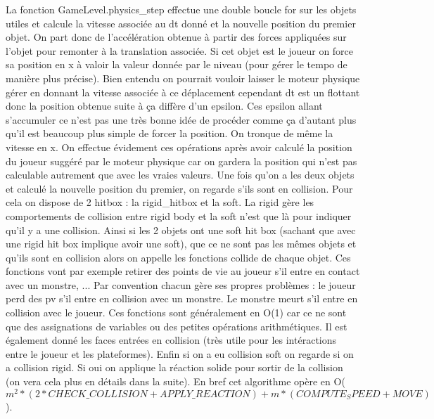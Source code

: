 \documentclass[11pt]{article}
\begin{document}
\indent La fonction GameLevel.physics\_step effectue une double boucle for sur les objets utiles et calcule la vitesse associée au dt donné et la nouvelle position du premier objet. On part donc de l'accélération obtenue à partir des forces appliquées sur l'objet pour remonter à la translation associée. Si cet objet est le joueur on force sa position en x à valoir la valeur donnée par le niveau (pour gérer le tempo de manière plus précise). Bien entendu on pourrait vouloir laisser le moteur physique gérer en donnant la vitesse associée à ce déplacement cependant dt est un flottant donc la position obtenue suite à ça diffère d'un epsilon. Ces epsilon allant s'accumuler ce n'est pas une très bonne idée de procéder comme ça d'autant plus qu'il est beaucoup plus simple de forcer la position. On tronque de même la vitesse en x. On effectue évidement ces opérations après avoir calculé la position du joueur suggéré par le moteur physique car on gardera la position qui n'est pas calculable autrement que avec les vraies valeurs. Une fois qu'on a les deux objets et calculé la nouvelle position du premier, on regarde s'ils sont en collision. Pour cela on dispose de 2 hitbox : la rigid\_hitbox et la soft. La rigid gère les comportements de collision entre rigid body et la soft n'est que là pour indiquer qu'il y a une collision. Ainsi si les 2 objets ont une soft hit box (sachant que avec une rigid hit box implique avoir une soft), que ce ne sont pas les mêmes objets et qu'ils sont en collision alors on appelle les fonctions collide de chaque objet. Ces fonctions vont par exemple retirer des points de vie au joueur s'il entre en contact avec un monstre, ... Par convention chacun gère ses propres problèmes : le joueur perd des pv s'il entre en collision avec un monstre. Le monstre meurt s'il entre en collision avec le joueur. Ces fonctions sont généralement en O(1) car ce ne sont que des assignations de variables ou des petites opérations arithmétiques. Il est également donné les faces entrées en collision (très utile pour les intéractions entre le joueur et les plateformes). Enfin si on a eu collision soft on regarde si on a collision rigid. Si oui on applique la réaction solide pour sortir de la collision (on vera cela plus en détails dans la suite). En bref cet algorithme opère en O($m^2*(2*CHECK\_COLLISION+APPLY\_REACTION)+m*(COMPUTE_SPEED+MOVE)$).\\
\end{document}
